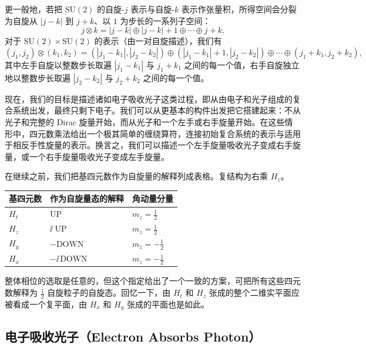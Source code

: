 更一般地，若把 $\mathrm{SU}(2)$ 的自旋-$j$ 表示与自旋-$k$ 表示作张量积，所得空间会分裂为自旋从 $|j-k|$ 到 $j+k$、以 $1$ 为步长的一系列子空间：
\begin{equation*}
j\otimes k=|j-k|\oplus|j-k|+1\oplus\cdots\oplus j+k .
\end{equation*}
对于 $\mathrm{SU}(2)\times\mathrm{SU}(2)$ 的表示（由一对自旋描述），我们有
\begin{equation*}
(j_1,j_2)\otimes(k_1,k_2)
=(|j_1-k_1|,|j_2-k_2|)\oplus(|j_1-k_1|+1,|j_2-k_2|)\oplus\cdots\oplus(j_1+k_1,j_2+k_2),
\end{equation*}
其中左手自旋以整数步长取遍 $|j_1-k_1|$ 与 $j_1+k_1$ 之间的每一个值，右手自旋独立地以整数步长取遍 $|j_2-k_2|$ 与 $j_2+k_2$ 之间的每一个值。

现在，我们的目标是描述诸如电子吸收光子这类过程，即从由电子和光子组成的复合系统出发，最终只剩下电子。我们可以从更基本的构件出发把它搭建起来：不从光子和完整的 Dirac 旋量开始，而从光子和一个左手或右手旋量开始。在这些情形中，四元数乘法给出一个极其简单的缠绕算符，连接初始复合系统的表示与适用于相反手性旋量的表示。换言之，我们可以描述一个左手旋量吸收光子变成右手旋量，或一个右手旋量吸收光子变成左手旋量。

在继续之前，我们把基四元数作为自旋量的解释列成表格。复结构为右乘 $H_z$。

\begin{center}
\begin{tabular}{lll}
\toprule
基四元数 & 作为自旋量态的解释 & 角动量分量 \\
\midrule
$H_t$ & UP & $m_z=\tfrac12$ \\
$H_z$ & $\ii$ UP & $m_z=\tfrac12$ \\
$H_y$ & $-\text{DOWN}$ & $m_z=-\tfrac12$ \\
$H_x$ & $-\ii\,\text{DOWN}$ & $m_z=-\tfrac12$ \\
\bottomrule
\end{tabular}
\end{center}

整体相位的选取是任意的，但这个指定给出了一个一致的方案，可把所有这些四元数解释为 $\tfrac12$ 自旋粒子的自旋态。回忆一下，由 $H_t$ 和 $H_z$ 张成的整个二维实平面应被看成一个复平面，由 $H_x$ 和 $H_y$ 张成的平面也是如此。

\subsection{电子吸收光子（Electron Absorbs Photon）}


